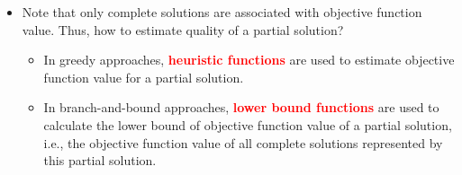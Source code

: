 \documentclass[mathserif]{beamer}
\begin{document}
{\begin{itemize}
	\item Note that only  complete solutions are associated with objective function value. Thus, how to estimate quality of a partial solution? 
		\begin{itemize}
			\item In greedy approaches, \textcolor{red}{\bf heuristic functions} are used to estimate objective function value for a partial solution. 
			\item In branch-and-bound approaches, \textcolor{red}{\bf lower bound functions} are used to calculate the lower bound of objective function value of a partial solution, i.e., the objective function value of all complete solutions represented by this partial solution. 
		\end{itemize}
\end{itemize}

}
\end{document}
